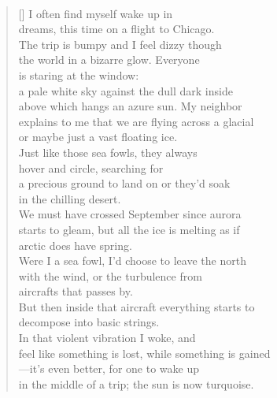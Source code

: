 \documentclass{book}
\begin{document}
\newpage
\poemtitle{\textcolor[RGB]{165,15,15}{Woke}}
\hspace*{\fill} \\
\settowidth{\versewidth}{feel like something is lost, while something is gained}
\begin{verse}[\versewidth]
    I often find myself wake up in \\
    dreams, this time on a flight to Chicago. \\
    The trip is bumpy and I feel dizzy though \\
    the world in a bizarre glow. Everyone \\
    is staring at the window: \\
    a pale white sky against the dull dark inside \\
    above which hangs an azure sun. My neighbor \\
    explains to me that we are flying across a glacial \\
    or maybe just a vast floating ice. \\
    Just like those sea fowls, they always \\
    hover and circle, searching for \\
    a precious ground to land on or they'd soak \\
    in the chilling desert. \\
    We must have crossed September since aurora \\
    starts to gleam, but all the ice is melting as if \\
    arctic does have spring. \\
    Were I a sea fowl, I'd choose to leave the north \\
    with the wind, or the turbulence from \\
    aircrafts that passes by. \\
    But then inside that aircraft everything starts to \\
    decompose into basic strings. \\
    In that violent vibration I woke, and \\
    feel like something is lost, while something is gained \\
    ---it's even better, for one to wake up \\
    in the middle of a trip; the sun is now turquoise. \\
\end{verse}
\end{document}
